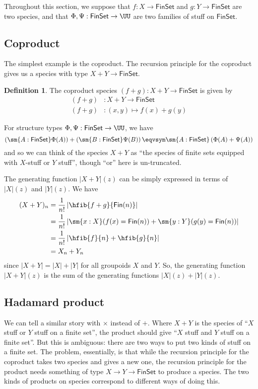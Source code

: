 \documentclass[fleqn]{article}
\newcommand{\gf}[1]{\abs{#1}\!(z)}
\newcommand{\fin}{\mathsf{Fin}}
\newcommand{\finset}{\mathsf{FinSet}}
\newcommand{\abs}[1]{\left\lvert #1 \right\rvert}
\theoremstyle{theorem}
\theoremstyle{definition}
\newtheorem{defn}{Definition}[section]
\begin{document}
Throughout this section, we suppose that $f : X \to \finset$ and $g : Y \to
\finset$ are two species, and that $\Phi, \Psi : \finset \to \UU$ are two
families of stuff on $\finset$.


\subsection{Coproduct}

The simplest example is the coproduct.  The recursion principle for the
coproduct gives us a species with type $X + Y \to \finset$.
\begin{defn}
  The coproduct species $(f + g) : X + Y \to \finset$ is given by
  \begin{align*}
    (f + g) &: X + Y \to \finset \\
    (f + g) &: (x, y) \mapsto f(x) + g(y)
  \end{align*}
\end{defn}
\noindent
For structure types $\Phi, \Psi : \finset \to \UU$, we have
\[
  \left(\sm{A : \finset}\Phi(A)\right) + \left(\sm{B : \finset}\Psi(B)\right)
  \eqvsym
  \sm{A : \finset}\left(\Phi(A) + \Psi(A)\right)
\]
and so we can think of the species $X + Y$ as ``the species of finite sets
equipped with $X$-stuff or $Y$ stuff'', though ``or'' here is un-truncated.

The generating function $\gf{X + Y}$ can be simply expressed in terms of
$\gf{X}$ and $\gf{Y}$.  We have
\begin{align*}
  (X+Y)_{n}
  &=
  \frac{1}{n!}\abs{\hfib{f+g}{\fin(n)}}
  \\&=
  \frac{1}{n!}\abs{
    \sm{x:X}(f(x) = \fin(n))
    +
    \sm{y:Y}(g(y) = \fin(n))
  }
  \\&=
  \frac{1}{n!}\abs{
    \hfib{f}{n} + \hfib{g}{n}
  }
  \\&=
  X_{n} + Y_{n}
\end{align*}
since $\abs{X + Y} = \abs{X} + \abs{Y}$ for all groupoids $X$ and $Y$.  So, the
generating function $\gf{X+Y}$ is the sum of the generating functions $\gf{X}
+ \gf{Y}$.

\subsection{Hadamard product}
We can tell a similar story with $\times$ instead of $+$.  Where $X + Y$ is
the species of ``$X$ stuff or $Y$ stuff on a finite set'', the product should
give ``$X$ stuff and $Y$ stuff on a finite set''.  But this is ambiguous: there are two ways to put
two kinds of stuff on a finite set.  The problem, essentially, is that while
the recursion principle for the coproduct takes two species and gives a new
one, the recursion principle for the product needs something of type $X \to Y
\to \finset$ to produce a species.  The two kinds of products on species
correspond to different ways of doing this.
\end{document}
